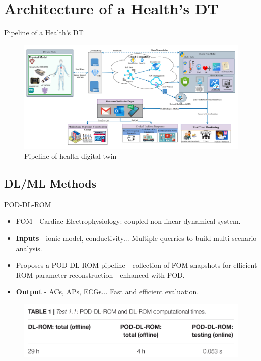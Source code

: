 \documentclass{beamer}
\begin{document}
\section{Architecture of a Health's DT}
\begin{frame}{Pipeline of a Health's DT}
    \begin{figure}
    \centering
    \includegraphics[width=1\linewidth]{images/Architecture_health_dt.png}
    \caption{Pipeline of health digital twin}
    \label{fig:PipelineHealthDT}
\end{figure}
\end{frame}

\subsection{DL/ML Methods}

\begin{frame}{POD-DL-ROM \cite{Fresca2021}}
  \begin{itemize}
    \item FOM - Cardiac Electrophysiology: coupled non-linear dynamical system.
    \item \textbf{Inputs} - ionic model, conductivity... Multiple querries to build multi-scenario analysis.
    \item Proposes a POD-DL-ROM pipeline - collection of FOM snapshots for efficient ROM parameter reconstruction - enhanced with POD.
    \item \textbf{Output} - ACs, APs, ECGs... Fast and efficient evaluation.
  \end{itemize}

  \begin{figure}
      \centering
      \includegraphics[width=1\linewidth]{images/POD-DL-ROM-perf.png}
      \caption{\textcite{Fresca2021}}
  \end{figure}
  
\end{frame}
\end{document}
